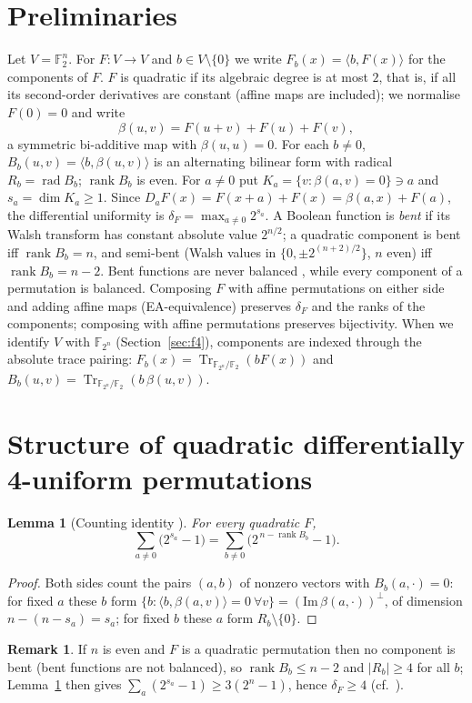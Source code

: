 \documentclass[11pt]{article}
\newtheorem{lemma}[theorem]{Lemma}
\theoremstyle{definition}
\newtheorem{remark}[theorem]{Remark}
\newcommand{\F}{\mathbb{F}}
\DeclareMathOperator{\rad}{rad}
\DeclareMathOperator{\Tr}{Tr}
\DeclareMathOperator{\rk}{rank}
\begin{document}
\section{Preliminaries}\label{sec:prelim}
Let $V=\F_2^n$. For $F:V\to V$ and $b\in V\setminus\{0\}$ we write
$F_b(x)=\langle b,F(x)\rangle$ for the components of $F$. $F$ is quadratic if its algebraic
degree is at most $2$, that is, if all its second-order derivatives are constant (affine maps
are included); we normalise $F(0)=0$ and write
\[
\beta(u,v)=F(u+v)+F(u)+F(v),
\]
a symmetric bi-additive map with $\beta(u,u)=0$. For each $b\neq 0$,
$B_b(u,v)=\langle b,\beta(u,v)\rangle$ is an alternating bilinear form with radical
$R_b=\rad B_b$; $\rk B_b$ is even. For $a\neq 0$ put
$K_a=\{v:\beta(a,v)=0\}\ni a$ and $s_a=\dim K_a\ge 1$. Since
$D_aF(x)=F(x+a)+F(x)=\beta(a,x)+F(a)$, the differential uniformity is
$\delta_F=\max_{a\neq 0}2^{s_a}$. A Boolean function is \emph{bent} if its Walsh transform
has constant absolute value $2^{n/2}$; a quadratic component is bent iff $\rk B_b=n$, and
semi-bent (Walsh values in $\{0,\pm 2^{(n+2)/2}\}$, $n$ even) iff $\rk B_b=n-2$. Bent functions
are never balanced \cite{Carlet21}, while every component of a permutation is balanced.
Composing $F$ with affine permutations on either side and adding affine maps (EA-equivalence)
preserves $\delta_F$ and the ranks of the components; composing with affine permutations
preserves bijectivity. When we identify $V$ with $\F_{2^n}$ (Section~\ref{sec:f4}), components
are indexed through the absolute trace pairing: $F_b(x)=\Tr_{\F_{2^n}/\F_2}(bF(x))$ and
$B_b(u,v)=\Tr_{\F_{2^n}/\F_2}(b\,\beta(u,v))$.

\section{Structure of quadratic differentially 4-uniform permutations}\label{sec:structure}

\begin{lemma}[Counting identity {\cite[Theorem~5]{CP19}}]\label{lem:count}
For every quadratic $F$,
\[\sum_{a\neq 0}\bigl(2^{s_a}-1\bigr)=\sum_{b\neq 0}\bigl(2^{\,n-\rk B_b}-1\bigr).\]
\end{lemma}
\begin{proof}
Both sides count the pairs $(a,b)$ of nonzero vectors with $B_b(a,\cdot)=0$: for fixed
$a$ these $b$ form $\{b:\langle b,\beta(a,v)\rangle=0\ \forall v\}=(\mathrm{Im}\,\beta(a,\cdot))^{\perp}$,
of dimension $n-(n-s_a)=s_a$; for fixed $b$ these $a$ form $R_b\setminus\{0\}$.
\end{proof}
\begin{remark}\label{rem:du-at-least-4}
If $n$ is even and $F$ is a quadratic permutation then no component is bent (bent
functions are not balanced), so $\rk B_b\le n-2$ and $|R_b|\ge 4$ for all $b$;
Lemma~\ref{lem:count} then gives $\sum_a (2^{s_a}-1)\ge 3(2^n-1)$, hence $\delta_F\ge 4$
(cf.\ \cite[Theorem~1]{CP19}).
\end{remark}
\end{document}

